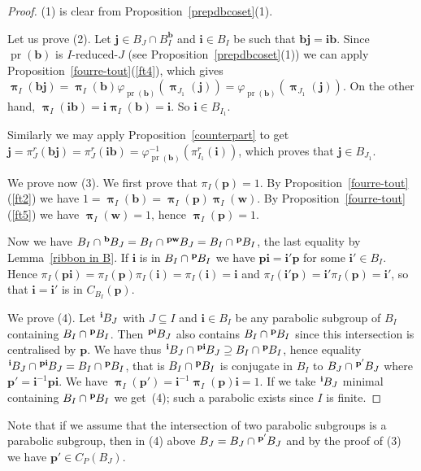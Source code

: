 \documentclass{amsart}
\numberwithin{equation}{section}
\newcommand\lexp[2]{\kern\scriptspace\vphantom{#2}^{#1}\kern-\scriptspace#2}
\newcommand\inv{^{-1}}
\newcommand\bb{{\mathbf b}}
\newcommand\bi{{\mathbf i}}
\newcommand\bj{{\mathbf j}}
\newcommand\bp{{\mathbf p}}
\newcommand\bw{{\mathbf w}}
\DeclareMathOperator\pr{pr}
\DeclareMathOperator\bpi{\boldsymbol\pi}
\begin{document}
\begin{proof}
(1) is clear from Proposition~\ref{prepdbcoset}(1).

Let us prove (2).
Let $\bj\in
B_J\cap  B_I^{\bb}$ and  $\bi\in B_I$  be such that  $\bb \bj  = \bi\bb$.
Since $\pr(\bb)$ is $I$-reduced-$J$ (see Proposition~\ref{prepdbcoset}(1)) we
 can apply Proposition~\ref{fourre-tout}(\ref{ft4}), which gives $\bpi_I(\bb  \bj)  =
\bpi_I(\bb)\varphi_{\pr(\bb)}(\bpi_{J_1}(\bj)) =
\varphi_{\pr(\bb)}(\bpi_{J_1}(\bj))$.  On the other hand, $\bpi_I(\bi\bb) =
\bi\bpi_I(\bb)  = \bi$. So $\bi\in B_{I_1}$.

Similarly we may apply Proposition~\ref{counterpart} to get
 $\bj=\pi_J^r(\bb\bj)=\pi_J^r(\bi\bb)=\varphi_{\pr(\bb)}\inv(\pi_{I_1}^r(\bi))$,
which proves that $\bj\in B_{J_1}$.

We prove now (3).
We first prove that $\pi_I(\bp)=1$.
By Proposition~\ref{fourre-tout}(\ref{ft2}) we have $1=\bpi_I(\bb)=\bpi_I(\bp)\bpi_I(\bw)$. By
Proposition~\ref{fourre-tout}(\ref{ft5}) we have 
$\bpi_I(\bw)=1$, hence $\bpi_I(\bp)=1$.

Now we have $B_I\cap\lexp \bb B_J=B_I\cap \lexp{\bp\bw} B_J=B_I\cap \lexp\bp B_I$, the last
equality by Lemma~\ref{ribbon in B}.
If $\bi$ is in $B_I\cap \lexp\bp B_I$ we have $\bp\bi=\bi'\bp$ for some $\bi'\in B_I$. Hence
$\pi_I(\bp\bi)=\pi_I(\bp)\pi_I(\bi)=\pi_I(\bi)=\bi$ and
$\pi_I(\bi'\bp)=\bi'\pi_I(\bp)=\bi'$, so that $\bi=\bi'$ is in $C_{B_I}(\bp)$.

We prove (4). Let $\lexp\bi B_J$ with $J\subseteq I$ and $\bi\in B_I$ be any
parabolic subgroup of $B_I$ containing $B_I\cap \lexp \bp B_I$.
Then $\lexp{\bp\bi}B_J$ also contains $B_I\cap \lexp \bp B_I$ since this
intersection is centralised by $\bp$. 
We have thus 
$\lexp\bi B_J\cap\lexp{\bp\bi}B_J\supseteq  B_I\cap\lexp \bp B_I$, hence
equality $\lexp\bi B_J\cap\lexp{\bp\bi}B_J= B_I\cap\lexp \bp B_I$,
that is $B_I\cap\lexp \bp B_I$ is conjugate in $B_I$ to $B_J\cap
\lexp{\bp'}B_J$ where $\bp'=\bi\inv\bp\bi$. We have
$\bpi_I(\bp')=\bi\inv\bpi_I(\bp)\bi=1$. If we take $\lexp\bi B_J$ minimal
containing $B_I\cap\lexp \bp B_I$ we get~(4); such a parabolic exists since $I$ is finite.
\end{proof}
Note that if we assume that the intersection of two parabolic subgroups is a
parabolic subgroup, then in (4) above $B_J=B_J\cap\lexp{\bp'}B_J$ and by
the proof of (3) we have $\bp'\in C_P(B_J)$.
\end{document}
